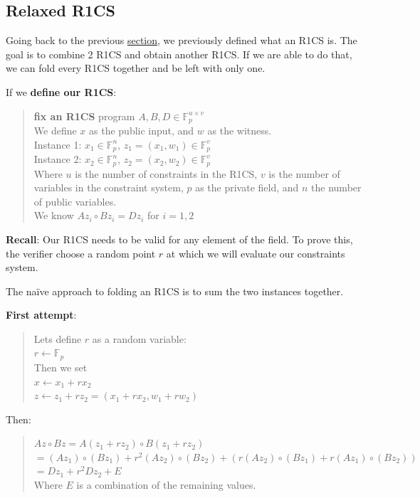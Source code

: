 \subsection{Relaxed R1CS}
Going back to the previous \hyperref[subsec:r1cs]{section}, we previously defined what an R1CS is.
The goal is to combine 2 R1CS and obtain another R1CS. If we are able to do that, we can fold every R1CS together and be left with only one.


If we \textbf{define our R1CS}:
\begin{quote}
\textbf{fix an R1CS} program $A,B,D \in \mathbb{F}^{u \times v}_p $
\\
We define $x$ as the public input, and $w$ as the witness.
\\
Instance 1: $ x_1 \in \mathbb{F}^n_p $, $ z_1 = (x_1, w_1) \in \mathbb{F}^v_p$
\\
Instance 2: $x_2 \in \mathbb{F}^n_p $, $ z_2 = (x_2, w_2) \in \mathbb{F}^v_p$
\\
Where $u$ is the number of constraints in the R1CS, $v$ is the number of variables in the constraint system, $p$ as the private field, and $n$ the number of public variables.
\\
We know $Az_i \circ Bz_i = Dz_i$ for $ i = 1,2$
\end{quote}


\textbf{Recall}: Our R1CS needs to be valid for any element of the field.
To prove this, the verifier choose a random point $r$ at which we will evaluate our constraints system.

The naïve approach to folding an R1CS is to sum the two instances together.

\textbf{First attempt}:
\begin{quote}
Lets define $r$ as a random variable:
\\
$r \leftarrow \mathbb{F}_p$
\\
Then we set 
\\
$x \leftarrow x_1+rx_2$
\\
$z \leftarrow z_1 + rz_2 = (x_1+rx_2, w_1 + rw_2)$
\end{quote}


Then:
\begin{quote}
   $Az \circ Bz = A(z_1 + r z_2) \circ B(z_1 + rz_2)$
   \\
   $= (Az_1) \circ (Bz_1) + r^2 (Az_2) \circ (Bz_2) + (r(Az_2) \circ (Bz_1) + r(Az_1) \circ (Bz_2))$
   \\
   $=Dz_1 + r^2Dz_2 + E$
   \\
   Where $E$ is a combination of the remaining values.
   \\
\end{quote}

